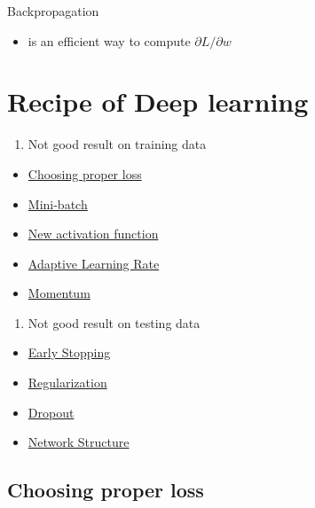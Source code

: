 \documentclass[
]{book}
\providecommand{\tightlist}{%
  \setlength{\itemsep}{0pt}\setlength{\parskip}{0pt}}
\begin{document}
Backpropagation

\begin{itemize}
\tightlist
\item
  is an efficient way to compute \(\partial L / \partial w\)
\end{itemize}

\hypertarget{recipe-of-deep-learning}{%
\section{Recipe of Deep learning}\label{recipe-of-deep-learning}}

\begin{enumerate}
\def\labelenumi{\arabic{enumi}.}
\tightlist
\item
  Not good result on training data
\end{enumerate}

\begin{itemize}
\tightlist
\item
  \protect\hyperlink{choosing-proper-loss}{Choosing proper loss}
\item
  \protect\hyperlink{mini-batch}{Mini-batch}
\item
  \protect\hyperlink{new-activation-function}{New activation function}
\item
  \protect\hyperlink{adaptive-learning-rate}{Adaptive Learning Rate}
\item
  \protect\hyperlink{momentum}{Momentum}
\end{itemize}

\begin{enumerate}
\def\labelenumi{\arabic{enumi}.}
\setcounter{enumi}{1}
\tightlist
\item
  Not good result on testing data
\end{enumerate}

\begin{itemize}
\tightlist
\item
  \protect\hyperlink{early-stopping}{Early Stopping}
\item
  \protect\hyperlink{regularization}{Regularization}
\item
  \protect\hyperlink{dropout}{Dropout}
\item
  \protect\hyperlink{network-structure}{Network Structure}
\end{itemize}

\hypertarget{choosing-proper-loss}{%
\subsection{Choosing proper loss}\label{choosing-proper-loss}}
\end{document}
